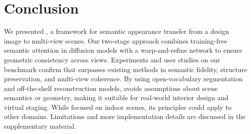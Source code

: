 \vfill
\section{Conclusion}
We presented \ours, a framework for semantic appearance transfer from a design image to multi-view scenes. Our two-stage approach combines training-free semantic attention in diffusion models with a warp-and-refine network to ensure geometric consistency across views. Experiments and user studies on our \dataset benchmark confirm that \ours surpasses existing methods in semantic fidelity, structure preservation, and multi-view coherence. By using open-vocabulary segmentation and off-the-shelf reconstruction models, \ours avoids assumptions about scene semantics or geometry, making it suitable for real-world interior design and virtual staging. While focused on indoor scenes, its principles could apply to other domains. Limitations and more implementation details are discussed in the supplementary material.

